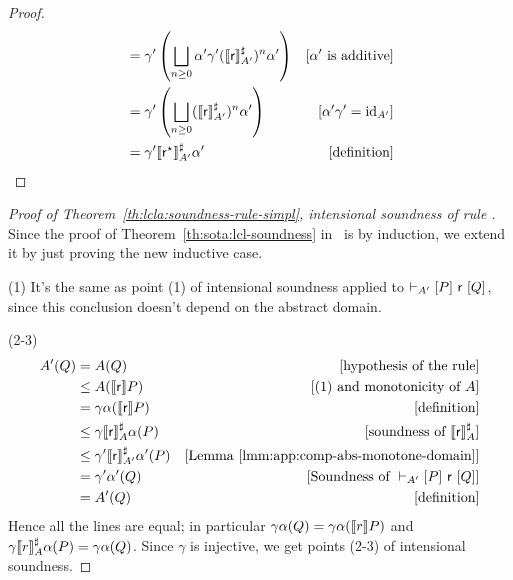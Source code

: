 \begin{proof}
\begin{align*}
		                                                & = \gamma' \left( \bigsqcup_{n \ge 0} \alpha' \gamma' (\llbracket\mathsf{r}\rrbracket^{\sharp}_{A'})^n \alpha' \right) & [\alpha' \text{ is additive}] \\
		                                                & = \gamma' \left( \bigsqcup_{n \ge 0} (\llbracket\mathsf{r}\rrbracket^{\sharp}_{A'})^n \alpha' \right)                 & [\alpha' \gamma' = \text{id}_{A'}]  \\
		                                                & = \gamma' \llbracket\mathsf{r}^\star\rrbracket^{\sharp}_{A'} \alpha'                                                 & [\text{definition}]
	\end{align*}
\end{proof}

\begin{proof}[Proof of Theorem~\ref{th:lcla:soundness-rule-simpl}, intensional soundness of rule ]
	Since the proof of Theorem~\ref{th:sota:lcl-soundness} in~\cite{BGGR21} is by induction, we extend it by just proving the new inductive case.

	(1) It's the same as point (1) of intensional soundness applied to $\vdash_{A'}\nobreak[P]~\mathsf{r}~[Q]$, since this conclusion doesn't depend on the abstract domain.

	\noindent (2-3)
	\begin{align*}
		A'(Q) & = A(Q)                                             & [\text{hypothesis of the rule}]                       \\
		      & \le A(\llbracket\mathsf{r}\rrbracket P)                             & [\text{(1) and monotonicity of }A]                    \\
		      & = \gamma \alpha(\llbracket\mathsf{r}\rrbracket P)                   & [\text{definition}]                                   \\
		      & \le \gamma \llbracket\mathsf{r}\rrbracket^{\sharp}_{A} \alpha(P)    & [\text{soundness of } \llbracket\mathsf{r}\rrbracket^{\sharp}_{A}]     \\
		      & \le \gamma' \llbracket\mathsf{r}\rrbracket^{\sharp}_{A'} \alpha'(P) & [\text{Lemma~\ref{lmm:app:comp-abs-monotone-domain}}] \\
		      & = \gamma' \alpha'(Q)                               & [\text{Soundness of }\vdash_{A'}\nobreak[P]~\mathsf{r}~[Q]]           \\
		      & = A'(Q)                                            & [\text{definition}]
	\end{align*}
	Hence all the lines are equal; in particular $\gamma \alpha(Q) = \gamma \alpha(\llbracket r\rrbracket P)$ and $\gamma \llbracket r\rrbracket^{\sharp}_{A} \alpha(P) = \gamma \alpha(Q)$. Since $\gamma$ is injective, we get points (2-3) of intensional soundness.
\end{proof}

